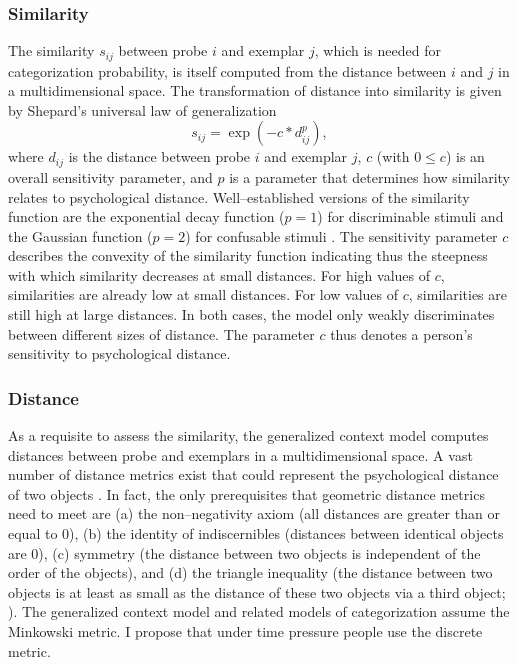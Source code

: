 \documentclass[a4paper,man,natbib]{apa6}
\begin{document}
\subsubsection{Similarity}
The similarity $s_{ij}$ between probe $i$ and exemplar $j$, which is needed for categorization probability, is itself computed from the distance between $i$ and $j$ in a multidimensional space. The transformation of distance into similarity is given by Shepard's universal law of generalization \citep{shepard1987toward}
\begin{equation}
s_{ij} = \exp\left(-c*d_{ij}^p\right),
\label{eq:similarity}
\end{equation}
where $d_{ij}$ is the distance between probe $i$ and exemplar $j$, $c$ (with $0 \leq c$) is an overall sensitivity parameter, and $p$ is a parameter that determines how similarity relates to psychological distance. Well--established versions of the similarity function are the exponential decay function ($p = 1$) for discriminable stimuli and the Gaussian function ($p = 2$) for confusable stimuli \citep{ennis1988confusable, nosofsky1985luce}. The sensitivity parameter $c$ describes the convexity of the similarity function indicating thus the steepness with which similarity decreases at small distances. For high values of $c$, similarities are already low at small distances. For low values of $c$, similarities are still high at large distances. In both cases, the model only weakly discriminates between different sizes of distance. The parameter $c$ thus denotes a person's sensitivity to psychological distance.

\subsubsection{Distance}
As a requisite to assess the similarity, the generalized context model computes distances between probe and exemplars in a multidimensional space. A vast number of distance metrics exist that could represent the psychological distance of two objects \citep{deza2009encyclopedia}. In fact, the only prerequisites that geometric distance metrics need to meet are (a) the non--negativity axiom (all distances are greater than or equal to 0), (b) the identity of indiscernibles (distances between identical objects are 0), (c) symmetry (the distance between two objects is independent of the order of the objects), and (d) the triangle inequality (the distance between two objects is at least as small as the distance of these two objects via a third object; \citealp{restle1959metric}). The generalized context model and related models of categorization assume the Minkowski metric. I propose that under time pressure people use the discrete metric.
\end{document}
